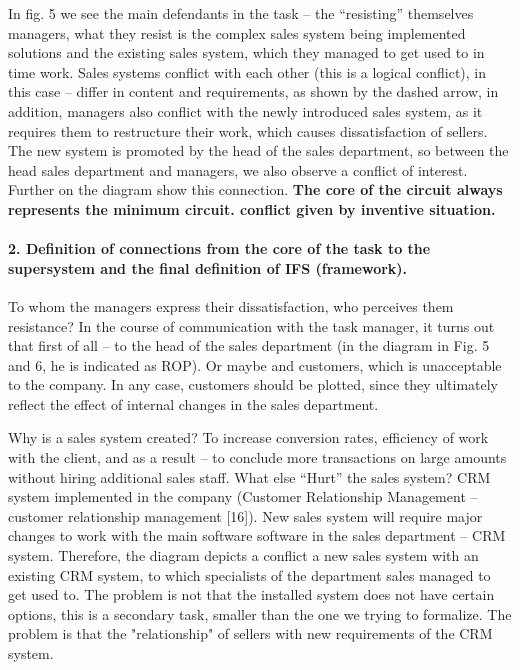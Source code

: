 
In fig. 5 we see the main defendants in the task -- the “resisting” themselves
managers, what they resist is the complex sales system being implemented
solutions and the existing sales system, which they managed to get used to in
time work. Sales systems conflict with each other (this is a logical
conflict), in this case -- differ in content and requirements, as shown by the
dashed arrow, in addition, managers also conflict with the newly introduced
sales system, as it requires them to restructure their work, which causes
dissatisfaction of sellers.  The new system is promoted by the head of the
sales department, so between the head sales department and managers, we also
observe a conflict of interest. Further on the diagram show this connection.
\textbf{The core of the circuit always represents the minimum circuit.
  conflict given by inventive situation.}

\paragraph{2. Definition of connections from the core of the task to the
  supersystem and the final definition of IFS (framework).}

To whom the managers express their dissatisfaction, who perceives them
resistance? In the course of communication with the task manager, it turns out
that first of all -- to the head of the sales department (in the diagram in
Fig. 5 and 6, he is indicated as ROP). Or maybe and customers, which is
unacceptable to the company. In any case, customers should be plotted, since
they ultimately reflect the effect of internal changes in the sales
department.

Why is a sales system created? To increase conversion rates, efficiency of
work with the client, and as a result -- to conclude more transactions on
large amounts without hiring additional sales staff. What else “Hurt” the
sales system? CRM system implemented in the company (Customer Relationship
Management -- customer relationship management [16]). New sales system will
require major changes to work with the main software software in the sales
department -- CRM system. Therefore, the diagram depicts a conflict a new
sales system with an existing CRM system, to which specialists of the
department sales managed to get used to. The problem is not that the installed
system does not have certain options, this is a secondary task, smaller than
the one we trying to formalize. The problem is that the "relationship" of
sellers with new requirements of the CRM system.

